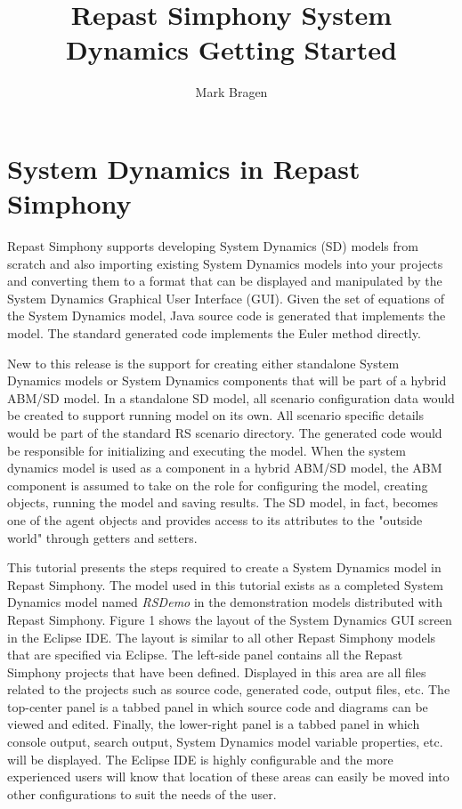 \documentclass[11pt]{amsart}
\title{Repast Simphony System Dynamics Getting Started}
\author{Mark Bragen}
\begin{document}
 
\maketitle

\section{System Dynamics in Repast Simphony}
Repast Simphony supports developing System Dynamics (SD) models from scratch and also importing existing System Dynamics models into your projects and converting them to a format that can be displayed and manipulated by the System Dynamics Graphical User Interface (GUI). Given the set of equations of the System Dynamics model, Java source code is generated that implements the model. The standard generated code implements the Euler method directly.

New to this release is the support for creating either standalone System Dynamics models or System Dynamics components that will be part of a hybrid ABM/SD model. In a standalone SD model, all scenario configuration data would be created to support running model on its own. All scenario specific details would be part of the standard RS scenario directory. The generated code would be responsible for initializing and executing the model. When the system dynamics model is used as a component in a hybrid ABM/SD model, the ABM component is assumed to take on the role for configuring the model, creating objects, running the model and saving results. The SD model, in fact, becomes one of the agent objects and provides access to its attributes to the "outside world" through getters and setters.

This tutorial presents the steps required to create a System Dynamics model in Repast Simphony. The model used in this tutorial exists as a  completed System Dynamics model named \textit{RSDemo} in the demonstration models distributed with Repast Simphony.
Figure 1 shows the layout of the System Dynamics GUI screen in the Eclipse IDE. The layout is similar to all other Repast Simphony models that are specified via Eclipse. The left-side panel contains all the Repast Simphony projects that have been defined. Displayed in this area are all files related to the projects such as source code, generated code, output files, etc. The top-center panel is a tabbed panel in which source code and diagrams can be viewed and edited. Finally, the lower-right panel is a tabbed panel in which console output, search output, System Dynamics model variable properties, etc. will be displayed. The Eclipse IDE is highly configurable and the more experienced users will know that location of these areas can easily be moved into other configurations to suit the needs of the user.\\
\end{document}
